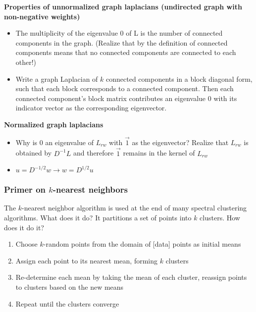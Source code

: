 \documentclass{article}
\begin{document}
        \textbf{Properties of unnormalized graph laplacians (undirected graph
with non-negative weights)}
        \begin{itemize}
           \item The multiplicity of the eigenvalue 0 of L is the number of
connected components in the graph. (Realize that by the definition of connected
components means that
no connected components are connected to each other!)
            \item Write a graph Laplacian of \ensuremath{k} connected components
in a block diagonal form, such that each block corresponds to a connected
component. Then each connected component's block matrix contributes an
eigenvalue \ensuremath{0} with its indicator vector as the corresponding
eigenvector.
        \end{itemize}
        \textbf{Normalized graph laplacians}
        \begin{itemize}
        \item Why is \ensuremath{0} an eigenvalue of \ensuremath{L_{rw}}
with \ensuremath{\vec{1}} as the eigenvector? Realize that \ensuremath{L_{rw}}
is obtained by \ensuremath{D^{-1}L} and therefore \ensuremath{\vec{1}} remains
in the kernel of \ensuremath{L_{rw}}
        \item \ensuremath{u=D^{-1/2}w \rightarrow w = D^{1/2}u}
        \end{itemize} 

        \subsubsection{Primer on \ensuremath{k}-nearest neighbors}
        The \ensuremath{k}-nearest neighbor algorithm is used at the end of many
spectral clustering algorithms. What does it do? It partitions a set of points
into \ensuremath{k} clusters.
        How does it do it?
        \begin{enumerate}
        \item Choose \ensuremath{k}-random points from the domain of [data] points
as initial means 
        \item Assign each point to its nearest mean, forming \ensuremath{k}
clusters
        \item Re-determine each mean by taking the mean of each cluster,
reassign points to clusters based on the new means
        \item Repeat until the clusters converge
        \end{enumerate}
    
\end{document}
